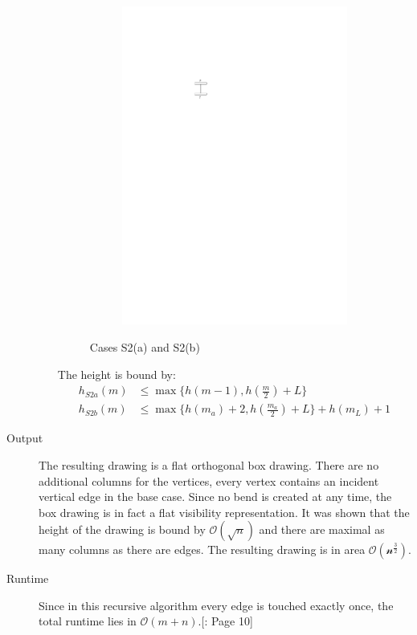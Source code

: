 \begin{description}
\begin{itemize}
\begin{figure}[H]
\begin{subfigure}{0.8\linewidth}
		\includegraphics[width=\textwidth,page=7]{drawings/2-trees.pdf}
		\caption{}
	\end{subfigure}
	\caption{Cases S2(a) and S2(b)}\label{im:SP_CaseS2ab}
\end{figure}
		The height is bound by:
		\begin{align}
			h_{S2a}(m)&\leq \max\{h(m-1),h\left(\frac{m}{2}\right)+L\}\\
			h_{S2b}(m)&\leq \max\{h(m_a)+2,h\left(\frac{m_a}{2}\right)+L\}+h(m_L)+1
		\end{align}
	\end{itemize}
	\item[Output] The resulting drawing is a flat orthogonal box drawing. There are no additional columns for the vertices, every vertex contains an incident vertical edge in the base case. Since no bend is created at any time, the box drawing is in fact a flat visibility representation. It was shown that the height of the drawing is bound by $\mathcal{O}(\sqrt{n})$ and there are maximal as many columns as there are edges. The resulting drawing is in area $\mathcal{O(n^{\frac{3}{2}})}$.
	\item[Runtime] Since in this recursive algorithm every edge is touched exactly once, the total runtime lies in $\mathcal{O}(m+n)$.[\cite{DBLP:journals/dcg/Biedl11}: Page 10]
\end{description}

